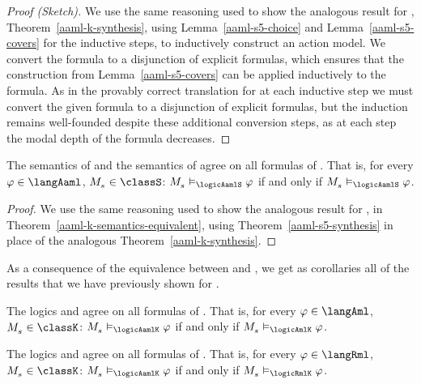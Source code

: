 \begin{proof}[Proof (Sketch)]
We use the same reasoning used to show the analogous result for \logicAamlK{}, Theorem~\ref{aaml-k-synthesis}, using Lemma~\ref{aaml-s5-choice} and Lemma~\ref{aaml-s5-covers} for the inductive steps, to inductively construct an action model.
We convert the formula to a disjunction of explicit formulas, which ensures that the construction from Lemma~\ref{aaml-s5-covers} can be applied inductively to the formula.
As in the provably correct translation for \logicRmlS{} at each inductive step we must convert the given formula to a disjunction of explicit formulas, but the induction remains well-founded despite these additional conversion steps, as at each step the modal depth of the formula decreases.
\end{proof}

\begin{theorem}\label{aaml-s5-semantics-equivalent}
The semantics of \logicAamlS{} and the semantics of \logicRamlS{} agree on all formulas of \langAaml{}.
That is, for every $\phi \in \langAaml$, $\kPModel{\kStateS} \in \classS$: $\kPModel{\kStateS} \entails_\logicAamlS \phi$ if and only if $\kPModel{\kStateS} \entails_\logicAamlS \phi$.
\end{theorem}

\begin{proof}
We use the same reasoning used to show the analogous result for \logicAamlK{}, in Theorem~\ref{aaml-k-semantics-equivalent}, using Theorem~\ref{aaml-s5-synthesis} in place of the analogous Theorem~\ref{aaml-k-synthesis}.
\end{proof}

As a consequence of the equivalence between \logicAamlS{} and \logicRamlS{}, we get as corollaries all of the results that we have previously shown for \logicRamlS{}.

\begin{corollary}
The logics \logicAamlS{} and \logicAmlS{} agree on all formulas of \langAml{}.
That is, for every $\phi \in \langAml$, $\kPModel{\kStateS} \in \classK$: $\kPModel{\kStateS} \entails_\logicAamlK \phi$ if and only if $\kPModel{\kStateS} \entails_\logicAmlK \phi$.
\end{corollary}

\begin{corollary}
The logics \logicAamlS{} and \logicRmlS{} agree on all formulas of \langRml{}.
That is, for every $\phi \in \langRml$, $\kPModel{\kStateS} \in \classK$: $\kPModel{\kStateS} \entails_\logicAamlK \phi$ if and only if $\kPModel{\kStateS} \entails_\logicRmlK \phi$.
\end{corollary}

